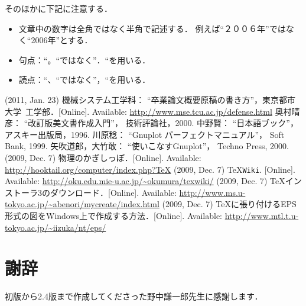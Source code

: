 \documentclass[onecolumn]{jsarticle}
\begin{document}
そのほかに下記に注意する．
\begin{itemize}
\item 文章中の数字は全角ではなく半角で記述する．
  例えば``２００６年''ではなく``2006年''とする．
\item 句点：``。``ではなく''．``を用いる．
\item 読点：``、``ではなく''，``を用いる．
\end{itemize}

{\small
\begin{thebibliography}{99}
  (2011, Jan. 23) 機械システム工学科：
  ``卒業論文概要原稿の書き方''，東京都市大学~工学部．[Online].
  Available: \url{http://www.mse.tcu.ac.jp/defense.html}
  奥村晴彦：
  ``改訂版\LaTeXe 美文書作成入門''，
  技術評論社，2000.
  中野賢：
  ``日本語\LaTeXe ブック''，
  アスキー出版局，1996.
  川原稔：
  ``Gnuplot パーフェクトマニュアル''，
  Soft Bank, 1999.
  矢吹道郎，大竹敢：
  ``使いこなすGnuplot''，
  Techno Press, 2000.
  (2009, Dec. 7) 物理のかぎしっぽ．[Online].
  Available: \url{http://hooktail.org/computer/index.php?TeX}
  (2009, Dec. 7) \TeX \texttt{Wiki}. [Online].
  Available: \url{http://oku.edu.mie-u.ac.jp/~okumura/texwiki/}
  (2009, Dec. 7) TeXインストーラ3のダウンロード．[Online].
  Available: \url{http://www.ms.u-tokyo.ac.jp/~abenori/mycreate/index.html}
  (2009, Dec. 7) TeXに張り付けるEPS形式の図をWindows上で作成する方法．[Online].
  Available: \url{http://www.mtl.t.u-tokyo.ac.jp/~iizuka/nt/eps/}
\end{thebibliography}
}

\section*{謝辞}
初版から2.4版まで作成してくださった野中謙一郎先生に感謝します．


\appendix
\end{document}
